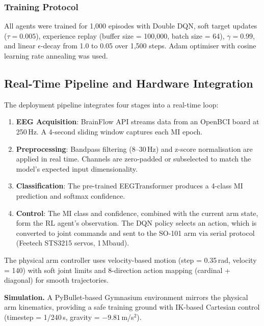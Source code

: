 \documentclass[12pt, a4paper]{article}
\begin{document}
\subsubsection{Training Protocol}

All agents were trained for 1,000 episodes with Double DQN, soft target updates ($\tau = 0.005$), experience replay (buffer size = 100,000, batch size = 64), $\gamma = 0.99$, and linear $\epsilon$-decay from 1.0 to 0.05 over 1,500 steps. Adam optimiser with cosine learning rate annealing was used.

\subsection{Real-Time Pipeline and Hardware Integration}

The deployment pipeline integrates four stages into a real-time loop:

\begin{enumerate}
    \item \textbf{EEG Acquisition}: BrainFlow API streams data from an OpenBCI board at 250\,Hz. A 4-second sliding window captures each MI epoch.
    \item \textbf{Preprocessing}: Bandpass filtering (8--30\,Hz) and z-score normalisation are applied in real time. Channels are zero-padded or subselected to match the model's expected input dimensionality.
    \item \textbf{Classification}: The pre-trained EEGTransformer produces a 4-class MI prediction and softmax confidence.
    \item \textbf{Control}: The MI class and confidence, combined with the current arm state, form the RL agent's observation. The DQN policy selects an action, which is converted to joint commands and sent to the SO-101 arm via serial protocol (Feetech STS3215 servos, 1\,Mbaud).
\end{enumerate}

The physical arm controller uses velocity-based motion (step = 0.35\,rad, velocity = 140) with soft joint limits and 8-direction action mapping (cardinal + diagonal) for smooth trajectories.

\textbf{Simulation.} A PyBullet-based Gymnasium environment mirrors the physical arm kinematics, providing a safe training ground with IK-based Cartesian control (timestep = 1/240\,s, gravity = $-9.81$\,m/s$^2$).
\end{document}
